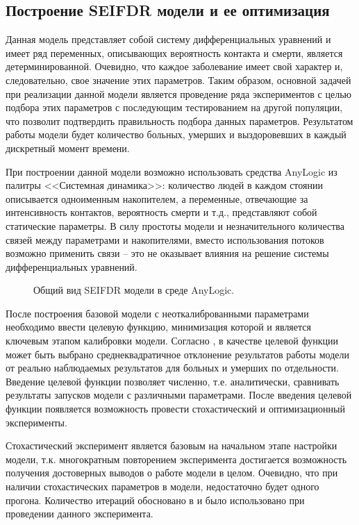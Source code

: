 \subsection{Построение SEIFDR модели и ее оптимизация}
Данная модель представляет собой систему дифференциальных  уравнений %
\cite{Wolfram_MW:SIR} и имеет ряд переменных, описывающих вероятность контакта и смерти, является детерминированной. Очевидно, что каждое заболевание имеет свой характер и, следовательно, свое значение этих параметров. Таким образом, основной задачей при реализации данной модели является проведение ряда экспериментов с целью подбора этих параметров с последующим тестированием на другой популяции, что позволит подтвердить правильность подбора данных параметров. Результатом работы модели будет  количество больных, умерших и выздоровевших в каждый дискретный момент времени.

При построении данной модели возможно использовать средства AnyLogic из палитры <<Системная динамика>>: количество людей в каждом стоянии описывается одноименным накопителем, а переменные, отвечающие за интенсивность контактов, вероятность смерти и т.д., представляют собой статические параметры. В силу простоты модели и незначительного количества связей между параметрами и накопителями, вместо использования потоков возможно применить связи -- это не оказывает влияния на решение системы дифференциальных уравнений. 


\begin{figure}[H]
	\caption{Общий вид SEIFDR модели в среде AnyLogic.}
\end{figure}


После построения базовой модели с неоткалиброванными параметрами необходимо ввести целевую функцию, минимизация которой и является ключевым этапом калибровки модели. Согласно  %
\cite[с. 26]{Bykova:2015}, в качестве  целевой функции может быть выбрано среднеквадратичное отклонение результатов работы модели от  реально наблюдаемых результатов для больных и  умерших  по отдельности. Введение целевой функции позволяет численно,  т.е. аналитически, сравнивать результаты запусков модели с различными параметрами.
После введения целевой функции появляется возможность провести стохастический и оптимизационный эксперименты.

Стохастический эксперимент является базовым на начальном этапе настройки модели,  т.к. многократным повторением эксперимента достигается возможность получения достоверных выводов о работе модели в целом. Очевидно, что при наличии стохастических  параметров в  модели, недостаточно будет одного прогона. Количество итераций обосновано в  %
\cite{Kondratiev:2010} и было использовано при проведении данного эксперимента. 

